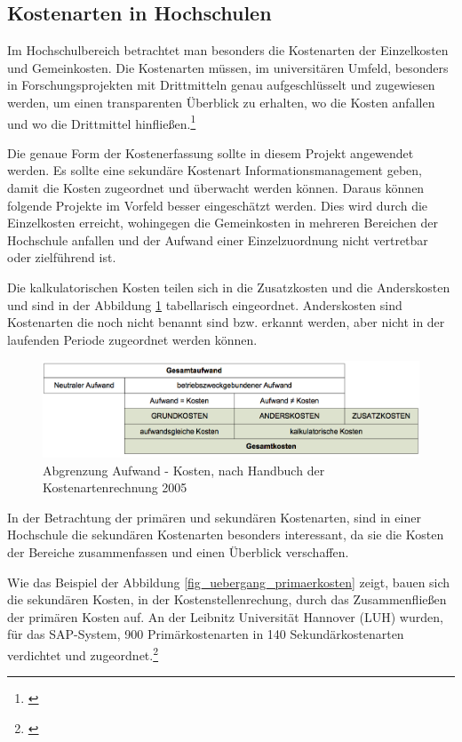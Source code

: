 \subsection{Kostenarten in Hochschulen}
Im Hochschulbereich betrachtet man besonders die Kostenarten der Einzelkosten und Gemeinkosten. Die Kostenarten müssen, im universitären Umfeld, besonders in Forschungsprojekten mit Drittmitteln genau aufgeschlüsselt und zugewiesen werden, um einen transparenten Überblick zu erhalten, wo die Kosten anfallen und wo die Drittmittel hinfließen.\footnote{\cite{pkl_2005}}

Die genaue Form der Kostenerfassung sollte in diesem Projekt angewendet werden. Es sollte eine sekundäre Kostenart Informationsmanagement geben, damit die Kosten zugeordnet und überwacht werden können. Daraus können folgende Projekte im Vorfeld besser eingeschätzt werden. Dies wird durch die Einzelkosten erreicht, wohingegen die Gemeinkosten in mehreren Bereichen der Hochschule anfallen und der Aufwand einer Einzelzuordnung nicht vertretbar oder zielführend ist.

Die kalkulatorischen Kosten teilen sich in die Zusatzkosten und die Anderskosten und sind in der Abbildung \ref{fig_abgrenzung_aufwand} tabellarisch eingeordnet. Anderskosten sind Kostenarten die noch nicht benannt sind bzw. erkannt werden, aber nicht in der laufenden Periode zugeordnet werden können. 

\begin{figure}[h!]
	\centering
	\includegraphics[width=\textwidth]
	{kapitel/gruppe4_2/bilder/abgrenzung_aufwand}
	\caption{Abgrenzung Aufwand - Kosten, nach Handbuch der Kostenartenrechnung 2005}
	\label{fig_abgrenzung_aufwand}
\end{figure}

In der Betrachtung der primären und sekundären Kostenarten, sind in einer Hochschule die sekundären Kostenarten besonders interessant, da sie die Kosten der Bereiche zusammenfassen und einen Überblick verschaffen.\newpage

Wie das Beispiel der Abbildung \ref{fig_uebergang_primaerkosten} zeigt, bauen sich die sekundären Kosten, in der Kostenstellenrechung, durch das Zusammenfließen der primären Kosten auf. An der Leibnitz Universität Hannover (LUH) wurden, für das SAP-System, 900 Primärkostenarten in 140 Sekundärkostenarten verdichtet und zugeordnet.\footnote{\cite{pkl_2005}}


